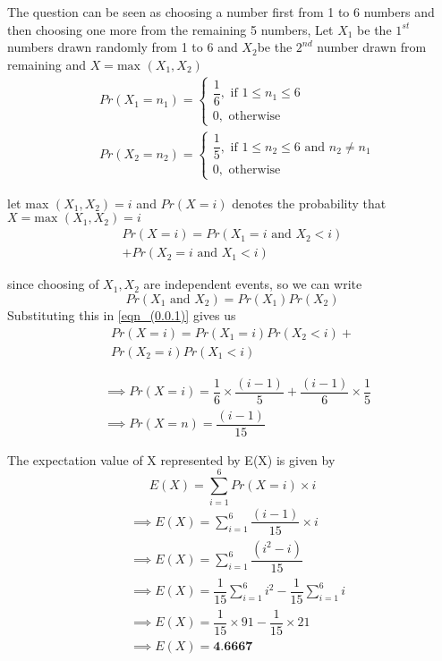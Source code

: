 The question can be seen as choosing a number first from 1 to 6 numbers and then choosing one more from the remaining 5 numbers, Let $X_1$ be the $1^{st}$ numbers drawn randomly from 1 to 6 and $X_2$be the $2^{nd}$ number drawn from remaining and $X = \text{max } (X_1,X_2)$
%
\begin{align}
& Pr(X_1=n_1)= \begin{cases}
\dfrac{1}{6},  \text{ if } 1 \leq n_1 \leq 6\\
0,  \text{  otherwise }
\end{cases}\\
& Pr(X_2=n_2)= \begin{cases}
\dfrac{1}{5},  \text{ if } 1 \leq n_2 \leq 6 \text{ and }n_2 \neq n_1\\
0,  \text{  otherwise }
\end{cases}
\end{align}

let max $(X_1,X_2)=i$ and $Pr(X=i)$ denotes the probability that $X = \text{max } (X_1,X_2)=i$
 \begin{multline}
Pr(X=i)=Pr(X_1=i\text{ and }X_2<i)\\
 +Pr(X_2=i\text{ and }X_1<i) \label{eqn_(0.0.1)}
\end{multline}
 

since choosing of $X_1,X_2$ are independent events, so we can write 
$$Pr(X_1 \text{ and }X_2)=Pr(X_1)Pr(X_2)$$
Substituting this in \eqref{eqn_(0.0.1)} gives us
\begin{multline}
Pr(X=i)=Pr(X_1=i)Pr(X_2<i)+\\
Pr(X_2=i)Pr(X_1<i)
\end{multline}

\begin{align}
& \implies Pr(X=i)=\dfrac{1}{6}\times \dfrac{(i-1)}{5}+\dfrac{(i-1)}{6} \times\dfrac{1}{5}\\
& \implies Pr(X=n)=\dfrac{(i-1)}{15}
\end{align}

The expectation value of X represented by E(X) is given by
$$E(X)=\sum_{i=1}^{6} Pr(X=i)\times i$$
\begin{align}
& \implies E(X)=\sum_{i=1}^{6} \dfrac{(i-1)}{15}\times i\\
& \implies E(X)=\sum_{i=1}^{6} \dfrac{(i^2-i)}{15}\\
& \implies E(X)=\dfrac{1}{15} \sum_{i=1}^{6} i^2-\dfrac{1}{15}\sum_{i=1}^{6} i\\
& \implies E(X)=\dfrac{1}{15} \times 91-\dfrac{1}{15} \times 21\\
& \implies E(X)= \textbf{4.6667}
\end{align}
